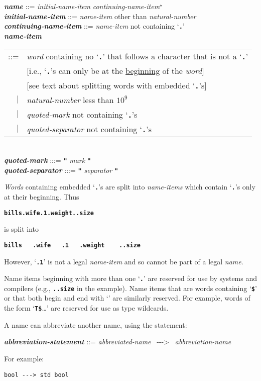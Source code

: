 \documentclass[12pt]{article}
\newcommand{\TT}[1]{{\tt \bfseries #1}}
\newcommand{\STAR}{{\Large $^\star$}}
\newcommand{\ABV}{-{}-{}->}
\newcommand{\emkey}[1]{{\em \bfseries #1}}
\newenvironment{indpar}[1][0.3in]%
	{\begin{list}{}%
		     {\setlength{\itemsep}{0in}%
		      \setlength{\topsep}{0in}%
		      \setlength{\parsep}{1ex}%
		      \setlength{\labelwidth}{#1}%
		      \setlength{\leftmargin}{#1}%
		      \addtolength{\leftmargin}{\labelsep}}%
	 \item}%
	{\end{list}}
\begin{document}
\begin{indpar}
\emkey{name}\label{NAME} ::=
    {\em initial-name-item} {\em continuing-name-item}\STAR{} \\
\emkey{initial-name-item} ::= {\em name-item} other than {\em natural-number} \\
\emkey{continuing-name-item} ::= {\em name-item} not containing `\TT{.}' \\
\emkey{name-item}\label{NAME-ITEM}
    \begin{tabular}[t]{@{}rl}
    ::= & {\em word} containing no `\TT{.}' that follows a character
                     that is not a `\TT{.}' \\
        & [i.e., `\TT{.}'s can only be at the \underline{beginning}
	   of the {\em word}] \\
        & [see text about splitting words with embedded `\TT{.}'s] \\
    $|$ & {\em natural-number} less than $10^9$ \\
    $|$ & {\em quoted-mark} not containing `\TT{.}'s \\
    $|$ & {\em quoted-separator} not containing `\TT{.}'s \\
    \end{tabular} \\
\emkey{quoted-mark} :::= \TT{"} {\em mark} \TT{"} \\
\emkey{quoted-separator} :::= \TT{"} {\em separator} \TT{"}
\end{indpar}

{\em Words} containing embedded `\TT{.}'s are split into
{\em name-items} which contain `\TT{.}'s only at their beginning.
Thus
\begin{center}
\TT{bills.wife.1.weight..size}
\end{center}
is split into
\begin{center}
\TT{bills~~~.wife~~~.1~~~.weight~~~~..size}
\end{center}
However, `\TT{.1}' is not a legal {\em name-item} and so cannot
be part of a legal {\em name}.

Name items beginning with more than one `\TT{.}' are reserved
for use by systems and compilers (e.g., \TT{..size} in the example).
Name items that are words containing `\TT{\$}' or that both
begin and end with `\TT{*}' are
similarly reserved.  For example, words of the form `\TT{T\$}\ldots'
are reserved for use as type wildcards.

A name can abbreviate another name, using the statement:
\begin{indpar}
\emkey{abbreviation-statement} ::=
    {\em abbreviated-name}~ \ABV{}~ {\em abbreviation-name}
\end{indpar}
For example:
\begin{center}
\tt bool \ABV{} std bool
\end{center}
\end{document}

